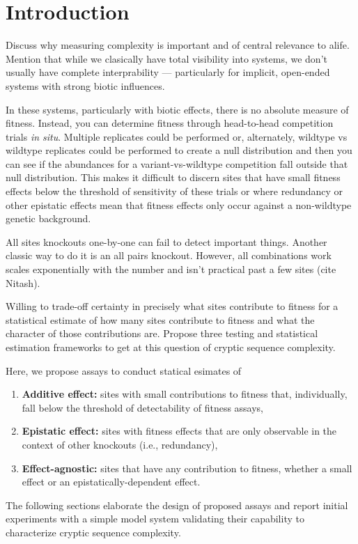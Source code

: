 \section{Introduction} \label{sec:introduction}

Discuss why measuring complexity is important and of central relevance to alife.
Mention that while we clasically have total visibility into systems, we don't usually have complete interprability --- particularly for implicit, open-ended systems with strong biotic influences.

In these systems, particularly with biotic effects, there is no absolute measure of fitness.
Instead, you can determine fitness through head-to-head competition trials \textit{in situ}.
Multiple replicates could be performed or, alternately, wildtype vs wildtype replicates could be performed to create a null distribution and then you can see if the abundances for a variant-vs-wildtype competition fall outside that null distribution.
This makes it difficult to discern sites that have small fitness effects below the threshold of sensitivity of these trials or where redundancy or other epistatic effects mean that fitness effects only occur against a non-wildtype genetic background.

All sites knockouts one-by-one can fail to detect important things.
Another classic way to do it is an all pairs knockout.
However, all combinations work scales exponentially with the number and isn't practical past a few sites (cite Nitash).

Willing to trade-off certainty in precisely what sites contribute to fitness for a statistical estimate of how many sites contribute to fitness and what the character of those contributions are.
Propose three testing and statistical estimation frameworks to get at this question of cryptic sequence complexity.

Here, we propose assays to conduct statical esimates of
\begin{enumerate}
\item \textbf{Additive effect:} sites with small contributions to fitness that, individually, fall below the threshold of detectability of fitness assays,
\item \textbf{Epistatic effect:} sites with fitness effects that are only observable in the context of other knockouts (i.e., redundancy),
\item \textbf{Effect-agnostic:} sites that have any contribution to fitness, whether a small effect or an epistatically-dependent effect.
\end{enumerate}

The following sections elaborate the design of proposed assays and report initial experiments with a simple model system validating their capability to characterize cryptic sequence complexity.
